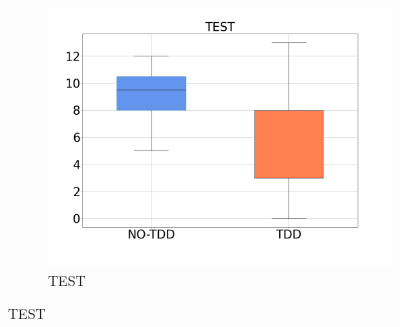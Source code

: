 \begin{figure}[H]
\begin{subfigure}{0.33\textwidth}
        \includegraphics[width=\linewidth]{figures/box_plots/task2/TEST.png}
        \caption{TEST}
        \label{bp_task2_test}
    \end{subfigure}


\end{figure}
